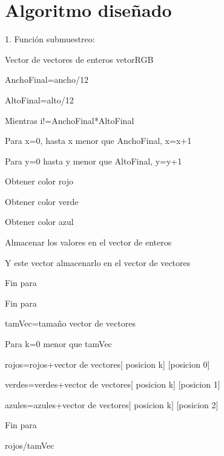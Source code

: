 \documentclass{article}
\begin{document}
\section{Algoritmo diseñado}\label{Algoritmo}

1. Función submuestreo: 

Vector de vectores de enteros
vetorRGB

AnchoFinal=ancho/12

AltoFinal=alto/12

Mientras i!=AnchoFinal*AltoFinal
    
\hspace{0.5cm}Para x=0, hasta x menor que AnchoFinal, x=x+1

\hspace{1cm}Para y=0 hasta y menor que AltoFinal, y=y+1

\hspace{1.5cm}Obtener color rojo

\hspace{1.5cm}Obtener color verde

\hspace{1.5cm}Obtener color azul

\hspace{1.5cm}Almacenar los valores en el vector de enteros

\hspace{1.5cm}Y este vector almacenarlo en el vector de vectores

\hspace{1cm}Fin para

\hspace{0.5cm}Fin para

\hspace{0.5cm}tamVec=tamaño vector de vectores

\hspace{0.5cm}Para k=0 menor que tamVec

\hspace{1cm}rojos=rojos+vector de vectores[ posicion k] [posicion 0]

\hspace{1cm}verdes=verdes+vector de vectores[ posicion k] [posicion 1]

\hspace{1cm}azules=azules+vector de vectores[ posicion k] [posicion 2]

\hspace{0.5cm}Fin para

\hspace{0.5cm}rojos/tamVec
\end{document}
